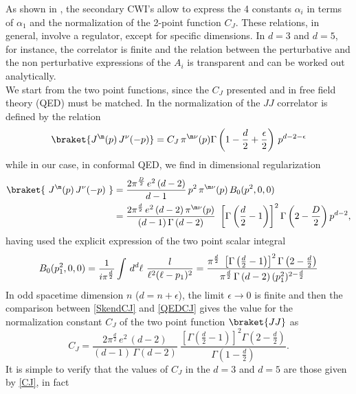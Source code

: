 \documentclass[a4paper,11pt,openright,twoside]{book}
\let\n=\nu      \let\x=\xi     \let\p=\pi      \let\r=\rho
\let\G=\Gamma  \let\D=\Delta \let\Q=\Theta  \let\L=\Lambda
\newcommand{\sdfrac}[2]{\mbox{\small$\displaystyle\frac{#1}{#2}$}}
\numberwithin{equation}{section}
\begin{document}
{{As shown in \cite{Bzowski:2013sza}, the secondary CWI's allow to express the 4 constants $\alpha_i$ in terms of $\alpha_1$ and the normalization of the 2-point function $C_J$. These relations, in general, involve a regulator, except for specific dimensions. In $d=3$ and $d=5$, for instance, the correlator is finite and the relation between the perturbative and the non perturbative expressions of the $A_i$ is transparent and can be worked out analytically. \\ 
We start from the two point functions,  since the $C_J$ presented \cite{Bzowski:2013sza} and in free field theory (QED) must be matched. In \cite{Bzowski:2013sza} the normalization of the $JJ$ correlator is defined by the relation
\begin{equation}
	\braket{J^{\m}(p)\,J^{\n}(-p)}=C_J\,\pi^{\m\n}(p)\G\left(1-\frac{d}{2}+\frac{\epsilon}{2}\right)\,p^{d-2-\epsilon}\label{SkendCJ}
\end{equation}
while in our case, in conformal QED, we find in dimensional regularization
\begin{align}
	\braket{\ J^{\m}(p)\,J^{\n}(-p)\ }&=\frac{2\p^\frac{D}{2}\,e^2\,(d-2)}{d-1}\,p^2\,\p^{\m\n}(p)\,B_0(p^2,0,0)\notag\\
	&=\frac{2\p^\frac{d}{2}\,e^2\,(d-2)\,\p^{\m\n}(p)}{(d-1)\,\G\left(d-2\right)}\ \left[\G\left(\frac{d}{2}-1\right)\right]^2\G\left(2-\frac{D}{2}\right)p^{d-2}\label{QEDCJ},
\end{align}
having used the explicit expression of the two point scalar integral 
\begin{equation}
	{B}_0(p_1^2,0,0)=\sdfrac{1}{i\p^\frac{d}{2}}\int\,d^d \ell\ \frac{l}{\ell^2(\ell-p_1)^2}=\frac{\p^\frac{d}{2}\ \left[\G\left(\frac{d}{2}-1\right)\right]^2\G\left(2-\frac{d}{2}\right)}{\p^\frac{d}{2}\,\G\left(d-2\right)(p_1^2)^{2-\frac{d}{2}}}\label{B0ex1}
\end{equation}
In odd spacetime dimension $n$ ($d=n +\epsilon$), the limit $\epsilon\to0$ is finite and then the comparison between \eqref{SkendCJ} and \eqref{QEDCJ} gives the value for the normalization constant $C_J$ of the two point function $\braket{JJ}$ as
\begin{equation}
	C_J=\frac{2\p^\frac{d}{2}\,e^2\,(d-2)}{(d-1)\,\G\left(d-2\right)}\ \frac{\left[\G\left(\frac{d}{2}-1\right)\right]^2\G\left(2-\frac{d}{2}\right)}{\G\left(1-\frac{d}{2}\right)}\label{CJ}.
\end{equation}
It is simple to verify that the values of $C_J$ in the $d=3$ and $d=5$ are those given by \eqref{CJ}, in fact
\begin{align}

\end{align}}}
\end{document}
